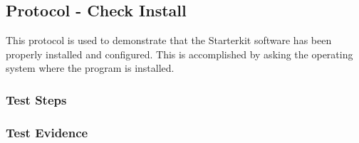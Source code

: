\newpage
\subsection{Protocol - Check Install}
This protocol is used to demonstrate that the Starterkit software has been
properly installed and configured.  This is accomplished by asking the operating
system where the program is installed.

\subsubsection{Test Steps}
      {}
      {}

\newpage
\subsubsection{Test Evidence}
      {}
      {}
